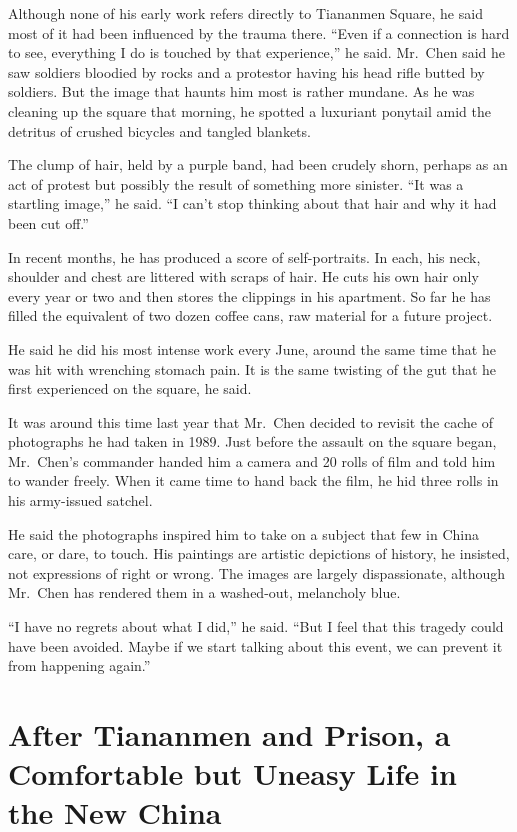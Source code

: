 \documentclass[12pt,a4paper,onecolumn]{article}
\begin{document}
Although none of his early work refers directly to Tiananmen Square, he said most of it had been
influenced by the trauma there. ``Even if a connection is hard to see, everything I do is touched by
that experience,'' he said. Mr.~Chen said he saw soldiers bloodied by rocks and a protestor having
his head rifle butted by soldiers. But the image that haunts him most is rather mundane. As he was
cleaning up the square that morning, he spotted a luxuriant ponytail amid the detritus of crushed
bicycles and tangled blankets.

The clump of hair, held by a purple band, had been crudely shorn, perhaps as an act of protest but
possibly the result of something more sinister. ``It was a startling image,'' he said. ``I can't
stop thinking about that hair and why it had been cut off.''

In recent months, he has produced a score of self-portraits. In each, his neck, shoulder and chest
are littered with scraps of hair. He cuts his own hair only every year or two and then stores the
clippings in his apartment. So far he has filled the equivalent of two dozen coffee cans, raw
material for a future project.

He said he did his most intense work every June, around the same time that he was hit with wrenching
stomach pain. It is the same twisting of the gut that he first experienced on the square, he said.

It was around this time last year that Mr.~Chen decided to revisit the cache of photographs he had
taken in 1989. Just before the assault on the square began, Mr.~Chen's commander handed him a camera
and 20 rolls of film and told him to wander freely. When it came time to hand back the film, he hid
three rolls in his army-issued satchel.

He said the photographs inspired him to take on a subject that few in China care, or dare, to touch.
His paintings are artistic depictions of history, he insisted, not expressions of right or wrong.
The images are largely dispassionate, although Mr.~Chen has rendered them in a washed-out,
melancholy blue.

``I have no regrets about what I did,'' he said. ``But I feel that this tragedy could have been
avoided. Maybe if we start talking about this event, we can prevent it from happening again.''

\section{After Tiananmen and Prison, a Comfortable but Uneasy Life in the New China}
\end{document}
